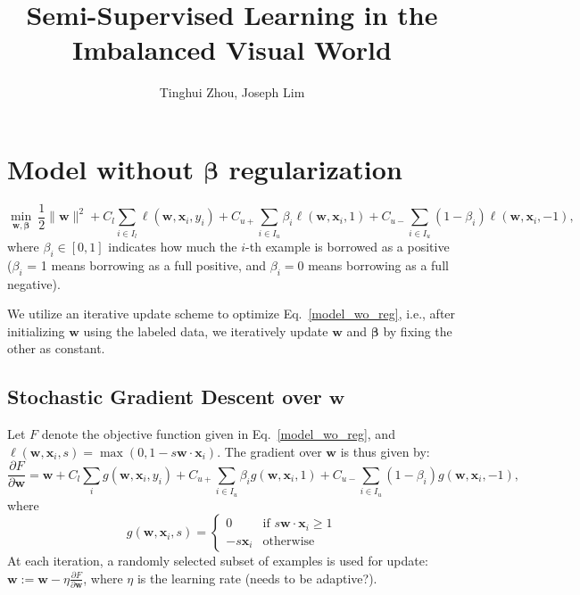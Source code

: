 \documentclass[12pt]{article}
\newcommand{\bx}{\mathbf{x}}
\newcommand{\bbeta}{\boldsymbol{\beta}}
\newcommand{\bw}{\mathbf{w}}
\begin{document}
\title{Semi-Supervised Learning in the Imbalanced Visual World}
\author{Tinghui Zhou, Joseph Lim}
\date{}

\maketitle

\section{Model without $\bbeta$ regularization}
\begin{equation}
\min_{\bw,\bbeta}~\frac{1}{2}\|\bw\|^2 + C_l \sum_{i\in I_l} \ell(\bw, \bx_i, y_i) + C_{u+}\sum_{i\in I_u}\beta_i \ell(\bw, \bx_i, 1) + C_{u-}\sum_{i\in I_u}(1-\beta_i) \ell(\bw, \bx_i, -1), \label{model_wo_reg}
\end{equation}
where $\beta_i \in [0, 1]$ indicates how much the $i$-th example is borrowed as a positive ($\beta_i$ = 1 means borrowing as a full positive, and $\beta_i = 0$ means borrowing as a full negative). 

We utilize an iterative update scheme to optimize Eq.~\ref{model_wo_reg}, i.e., after initializing $\bw$ using the labeled data, we iteratively update $\bw$ and $\bbeta$ by fixing the other as constant.

\subsection{Stochastic Gradient Descent over $\bw$}
Let $F$ denote the objective function given in Eq.~\ref{model_wo_reg}, and $\ell(\bw, \bx_i, s) = \max(0, 1 - s\bw\cdot\bx_i)$. The gradient over $\bw$ is thus given by:
\begin{equation}
\frac{\partial F}{\partial \bw} = \bw + C_l\sum_ig(\bw, \bx_i, y_i) + C_{u+}\sum_{i\in I_u}\beta_i g(\bw, \bx_i, 1) + C_{u-}\sum_{i\in I_u}(1-\beta_i) g(\bw, \bx_i, -1),
\end{equation}
where 
$$
g(\bw, \bx_i, s) =
  \begin{cases}
   0 & \text{if } s\bw\cdot\bx_i \geq 1  \\
   -s\bx_i & \text{otherwise}
  \end{cases}
$$
At each iteration, a randomly selected subset of examples is used for update: $\bw := \bw - \eta\frac{\partial F}{\partial \bw}$, where $\eta$ is the learning rate (needs to be adaptive?).
\end{document}
